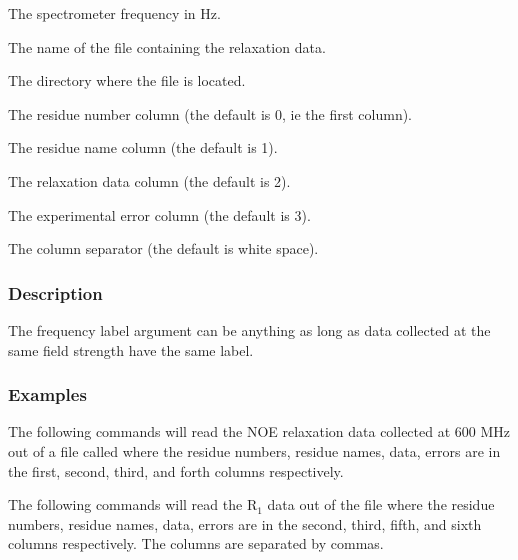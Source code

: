    The spectrometer frequency in Hz.   

   The name of the file containing the relaxation data.   

   The directory where the file is located.   

   The residue number column (the default is 0, ie the first column).   

   The residue name column (the default is 1).   

   The relaxation data column (the default is 2).   

   The experimental error column (the default is 3).   

   The column separator (the default is white space).  

  

  
 \subsubsection{Description} 

 The frequency label argument can be anything as long as data collected at the same field strength have the same label. 
  

  
 \subsubsection{Examples} 

 The following commands will read the NOE relaxation data collected at 600 MHz out of a file called  where the residue numbers, residue names, data, errors are in the first, second, third, and forth columns respectively. 
  



 The following commands will read the R$_1$ data out of the file  where the residue numbers, residue names, data, errors are in the second, third, fifth, and sixth columns respectively.  The columns are separated by commas. 
  


